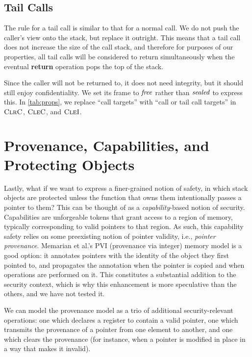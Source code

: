 \documentclass[10pt,conference]{ieeetran}%
\theoremstyle{definition}
\begin{document}
\subsection{Tail Calls}

The rule for a tail call is similar to that for a normal call.
We do not push the caller's view onto the stack,
but replace it outright. This means that a tail call does not increase the size of
the call stack, and therefore for purposes of our properties, all tail
calls will
be considered to return simultaneously when the eventual {\bf return} operation
pops the top of the stack.

Since the caller will not be returned to, it does not need integrity, but
it should still enjoy confidentiality. We set its frame to \(\mathit{free}\) rather
than \(\mathit{sealed}\) to express this. In \cref{tab:props}, we replace
``call targets'' with ``call or tail call targets'' in \(\textnormal{\sc ClrC}\), \(\textnormal{\sc CleC}\), and \(\textnormal{\sc CleI}\).

\section{Provenance, Capabilities, and Protecting Objects}
\label{app:ptr}

Lastly, what if we want to express a finer-grained notion of safety, in which
stack objects are protected unless the function that owns them intentionally
passes a pointer to them? This can be thought of as a {\it capability}-based
notion of security. Capabilities are unforgeable tokens that grant access to
a region of memory, typically corresponding to valid pointers to that region.
As such, this capability safety relies on some preexisting notion of pointer
validity, i.e., {\it pointer provenance}.
Memarian et al.'s PVI \cite{provenance} (provenance via integer)
memory model is a good option: it annotates pointers with the identity of the
object they first pointed to, and propagates the annotation when the
pointer is copied and when operations are performed on it.
This constitutes a substantial addition to the security context, which is why
this enhancement is more speculative than the others, and we have not tested it.

We can model the provenance model as a trio of additional security-relevant operations: one which
declares a register to contain a valid pointer, one which transmits the provenance
of a pointer from one element to another, and one which clears the provenance
(for instance, when a pointer is modified in place in a way that makes it invalid).
\end{document}
